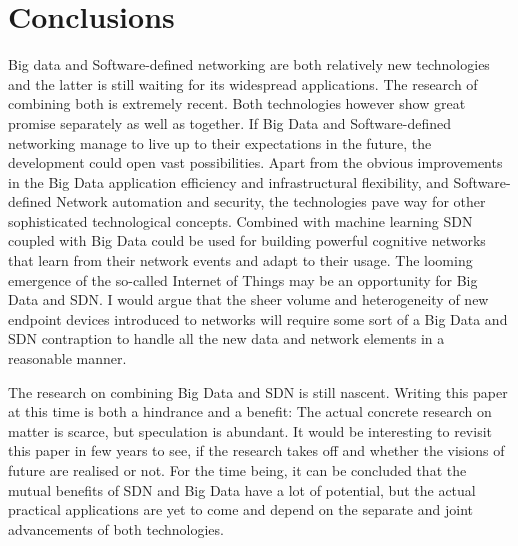 \documentclass{acm_proc_article-sp}
\begin{document}
\section{Conclusions}

Big data and Software-defined networking are both relatively new technologies and the latter is still waiting for its widespread applications. The research of combining both is extremely recent. Both technologies however show great promise separately as well as together. If Big Data and Software-defined networking manage to live up to their expectations in the future, the development could open vast possibilities. Apart from the obvious improvements in the Big Data application efficiency and infrastructural flexibility, and Software-defined Network automation and security, the technologies pave way for other sophisticated technological concepts. Combined with machine learning SDN coupled with Big Data could be used for building powerful cognitive networks that learn from their network events and adapt to their usage. The looming emergence of the so-called Internet of Things may be an opportunity for Big Data and SDN. I would argue that the sheer volume and heterogeneity of new endpoint devices introduced to networks will require some sort of a Big Data and SDN contraption to handle all the new data and network elements in a reasonable manner.

The research on combining Big Data and SDN is still nascent. Writing this paper at this time is both a hindrance and a benefit: The actual concrete research on matter is scarce, but speculation is abundant. It would be interesting to revisit this paper in few years to see, if the research takes off and whether the visions of future are realised or not. For the time being, it can be concluded that the mutual benefits of SDN and Big Data have a lot of potential, but the actual practical applications are yet to come and depend on the separate and joint advancements of both technologies.



\end{document}
